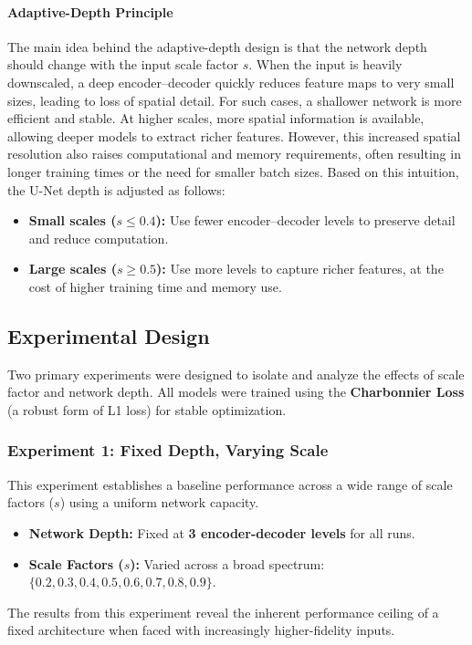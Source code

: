 \paragraph{Adaptive-Depth Principle}

The main idea behind the adaptive-depth design is that the network depth should change with the input scale factor $s$. 
When the input is heavily downscaled, a deep encoder–decoder quickly reduces feature maps to very small sizes, leading to loss of spatial detail. 
For such cases, a shallower network is more efficient and stable. 
At higher scales, more spatial information is available, allowing deeper models to extract richer features. 
However, this increased spatial resolution also raises computational and memory requirements, often resulting in longer training times or the need for smaller batch sizes. 
Based on this intuition, the U-Net depth is adjusted as follows:
\begin{itemize}
    \item \textbf{Small scales ($s \le 0.4$):} Use fewer encoder–decoder levels to preserve detail and reduce computation.  
    \item \textbf{Large scales ($s \ge 0.5$):} Use more levels to capture richer features, at the cost of higher training time and memory use.
\end{itemize}

\subsection{Experimental Design}
\label{subsec:exp_design}

Two primary experiments were designed to isolate and analyze the effects of scale factor and network depth. All models were trained using the \textbf{Charbonnier Loss} (a robust form of L1 loss) for stable optimization.

\subsubsection{Experiment 1: Fixed Depth, Varying Scale}
This experiment establishes a baseline performance across a wide range of scale factors ($s$) using a uniform network capacity.
\begin{itemize}
    \item \textbf{Network Depth:} Fixed at \textbf{3 encoder-decoder levels} for all runs.
    \item \textbf{Scale Factors ($s$):} Varied across a broad spectrum: $\{0.2, 0.3, 0.4, 0.5, 0.6, 0.7, 0.8, 0.9\}$.
\end{itemize}
The results from this experiment reveal the inherent performance ceiling of a fixed architecture when faced with increasingly higher-fidelity inputs.

